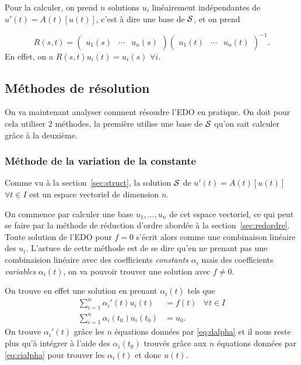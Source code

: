 Pour la calculer, on prend $n$ solutions $u_i$ linéairement indépendantes
de $u'(t) = A(t)[u(t)]$, c'est à dire une base de $\mathcal{S}$, et on prend

\[ R(s, t) =
  \begin{pmatrix}
    u_1(s) & \cdots & u_n(s)
  \end{pmatrix}
  \begin{pmatrix}
    u_1(t) & \cdots & u_n(t)
\end{pmatrix}^{-1}. \]
En effet, on a $R(s, t) u_i(t) = u_i(s)$ $\forall i$.

\subsection{Méthodes de résolution}
On va maintenant analyser comment résoudre l'EDO en pratique.
On doit pour cela utiliser 2 méthodes,
la première utilise une base de $\mathcal{S}$ qu'on sait calculer grâce à la deuxième.

\subsubsection{Méthode de la variation de la constante}
Comme vu à la section~\ref{sec:struct},
la solution $\mathcal{S}$ de
$u'(t) = A(t)[u(t)]$ $\forall t \in I$
est un espace vectoriel de dimension $n$.

On commence par calculer une base $u_1,\ldots,u_n$ de cet espace vectoriel,
ce qui peut se faire par la méthode de réduction d'ordre abordée
à la section~\ref{sec:redordre}.
Toute solution de l'EDO pour $f = 0$ s'écrit alors comme une combinaison
linéaire des $u_i$.
L'astuce de cette méthode est de se dire qu'en ne prenant pas une combinaision
linéaire avec des coefficients \emph{constants} $\alpha_i$ mais des coefficients
\emph{variables} $\alpha_i(t)$,
on va pouvoir trouver une solution avec $f \neq 0$.

On trouve en effet une solution en prenant $\alpha_i(t)$ tels que
\begin{align}
  \label{eq:dalpha}
  \sum_{i=1}^n \alpha_i'(t)u_i(t) & = f(t) & \forall t \in I\\
  \label{eq:cialpha}
  \sum_{i=1}^n \alpha_i(t_0)u_i(t_0) & = u_0.
\end{align}
On trouve $\alpha_i'(t)$ grâce les
$n$ équations données par \eqref{eq:dalpha}
et il nous reste plus qu'à intégrer à l'aide des
$\alpha_i(t_0)$ trouvés grâce aux
$n$ équations données par \eqref{eq:cialpha}
pour trouver les $\alpha_i(t)$
et donc $u(t)$.


